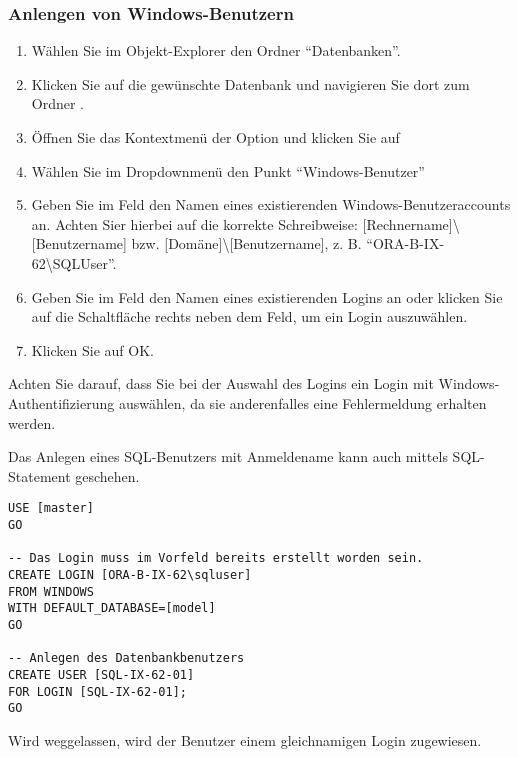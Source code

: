           \subsubsection{Anlengen von Windows-Benutzern}
            \begin{enumerate}
              \item Wählen Sie im Objekt-Explorer den Ordner
              \enquote{Datenbanken}.
              \item Klicken Sie auf die gewünschte Datenbank und navigieren
              Sie dort zum Ordner .
              \item Öffnen Sie das Kontextmenü der Option 
              und klicken Sie auf 
              \item Wählen Sie im Dropdownmenü  den Punkt
              \enquote{Windows-Benutzer}
              \item Geben Sie im Feld  den Namen eines
              existierenden Windows-Benutzeraccounts an. Achten Sier hierbei
              auf die korrekte Schreibweise:
              [Rechnername]\textbackslash [Benutzername] bzw.
              [Domäne]\textbackslash [Benutzername], z. B.
              \enquote{ORA-B-IX-62\textbackslash SQLUser}.
              \item Geben Sie im Feld  den Namen eines
              existierenden Logins an oder klicken Sie auf die Schaltfläche
              rechts neben dem Feld, um ein Login auszuwählen.
              \item Klicken Sie auf OK.
            \end{enumerate}
            \begin{merke}
              Achten Sie darauf, dass Sie bei der Auswahl des Logins ein Login
              mit Windows-Authentifizierung auswählen, da sie anderenfalles eine
              Fehlermeldung erhalten werden.
            \end{merke}
            Das Anlegen eines SQL-Benutzers mit Anmeldename kann auch mittels
            SQL-Statement geschehen.
            \begin{lstlisting}[language=ms_sql, caption={Anlegen eines
            Windows-Benutzers}, label=admin19_08c]
USE [master]
GO

-- Das Login muss im Vorfeld bereits erstellt worden sein.
CREATE LOGIN [ORA-B-IX-62\sqluser]
FROM WINDOWS 
WITH DEFAULT_DATABASE=[model]
GO

-- Anlegen des Datenbankbenutzers
CREATE USER [SQL-IX-62-01]
FOR LOGIN [SQL-IX-62-01];
GO
            \end{lstlisting}
            \begin{merke}
              Wird  weggelassen, wird der Benutzer einem
              gleichnamigen Login zugewiesen.
            \end{merke}
            \begin{literaturinternet}
              \item \cite{ms173463}
            \end{literaturinternet}
